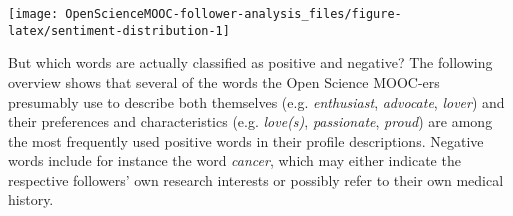 \documentclass[]{article}
\newenvironment{Shaded}{\begin{snugshade}}{\end{snugshade}}
\newcommand{\KeywordTok}[1]{\textcolor[rgb]{0.13,0.29,0.53}{\textbf{#1}}}
\newcommand{\DataTypeTok}[1]{\textcolor[rgb]{0.13,0.29,0.53}{#1}}
\newcommand{\DecValTok}[1]{\textcolor[rgb]{0.00,0.00,0.81}{#1}}
\newcommand{\FloatTok}[1]{\textcolor[rgb]{0.00,0.00,0.81}{#1}}
\newcommand{\StringTok}[1]{\textcolor[rgb]{0.31,0.60,0.02}{#1}}
\newcommand{\CommentTok}[1]{\textcolor[rgb]{0.56,0.35,0.01}{\textit{#1}}}
\newcommand{\OperatorTok}[1]{\textcolor[rgb]{0.81,0.36,0.00}{\textbf{#1}}}
\newcommand{\NormalTok}[1]{#1}
\begin{document}
\begin{Shaded}
\end{Shaded}

\begin{center}\texttt{[image: OpenScienceMOOC-follower-analysis\_files/figure-latex/sentiment-distribution-1]} \end{center}

But which words are actually classified as positive and negative? The
following overview shows that several of the words the Open Science
MOOC-ers presumably use to describe both themselves (e.g.
\emph{enthusiast}, \emph{advocate}, \emph{lover}) and their preferences
and characteristics (e.g. \emph{love(s)}, \emph{passionate},
\emph{proud}) are among the most frequently used positive words in their
profile descriptions. Negative words include for instance the word
\emph{cancer}, which may either indicate the respective followers' own
research interests or possibly refer to their own medical history.
\end{document}

